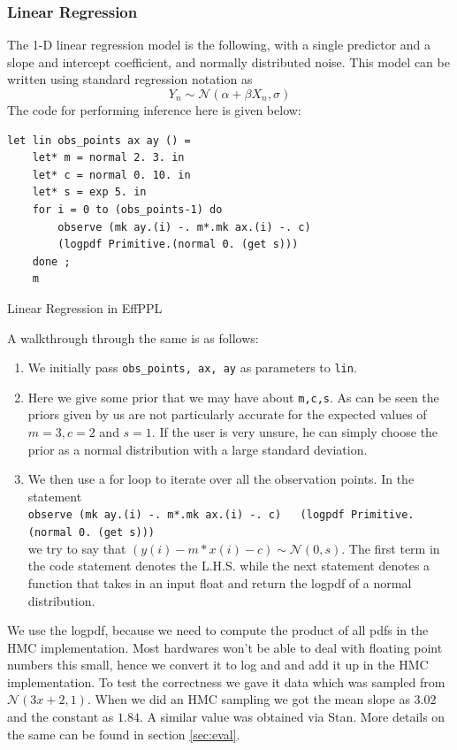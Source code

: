 \documentclass[a4paper,11pt]{article}
\theoremstyle{mytheor}
\begin{document}
        \subsubsection{Linear Regression}
            The 1-D linear regression model is the following, with a single predictor and a slope and intercept coefficient, and normally distributed noise. This model can be written using standard regression notation as
            \begin{equation*}
                Y_n \sim \mathcal{N}( \alpha + \beta X_n , \sigma )
            \end{equation*}
            The code for performing inference here is given below:\\
\begin{listing}[H]\centering
\begin{verbatim}
let lin obs_points ax ay () =
	let* m = normal 2. 3. in 
	let* c = normal 0. 10. in 
	let* s = exp 5. in 
	for i = 0 to (obs_points-1) do 
		observe (mk ay.(i) -. m*.mk ax.(i) -. c) 
		(logpdf Primitive.(normal 0. (get s)))
	done ;
	m 
\end{verbatim}
\caption{Linear Regression in EffPPL}
\end{listing}
    A walkthrough through the same is as follows:
    \begin{enumerate}
        \item We initially pass \lstinline{obs_points, ax, ay} as parameters to \lstinline{lin}.
        \item Here we give some prior that we may have about \lstinline{m,c,s}. As can be seen the priors given by us are not particularly accurate for the expected values of $m=3, c=2$ and $s = 1$. If the user is very unsure, he can simply choose the prior as a normal distribution with a large standard deviation.
        \item We then use a for loop to iterate over all the observation points. In the statement\\ \lstinline{observe (mk ay.(i) -. m*.mk ax.(i) -. c)   (logpdf Primitive.(normal 0. (get s)))}\\ we try to say that $(y(i) - m*x(i) - c) \sim \mathcal{N}(0, s)$. The first term in the code statement denotes the L.H.S. while the next statement denotes a function that takes in an input float and return the logpdf of a normal distribution. 
    \end{enumerate}
    We use the logpdf, because we need to compute the product of all pdfs in the HMC implementation. Most hardwares won't be able to deal with floating point numbers this small, hence we convert it to log and and add it up in the HMC implementation.  To test the correctness we gave it data which was sampled from $\mathcal{N}( 3x + 2 , 1 )$. When we did an HMC sampling we got the mean slope as $3.02$ and the constant as $1.84$. A similar value was obtained via Stan. More details on the same can be found in section \ref{sec:eval}. 
\end{document}
